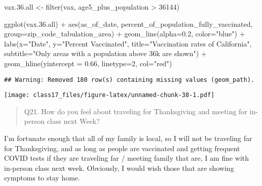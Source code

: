 \documentclass[
]{article}
\newenvironment{Shaded}{\begin{snugshade}}{\end{snugshade}}
\newcommand{\AttributeTok}[1]{\textcolor[rgb]{0.77,0.63,0.00}{#1}}
\newcommand{\DecValTok}[1]{\textcolor[rgb]{0.00,0.00,0.81}{#1}}
\newcommand{\FloatTok}[1]{\textcolor[rgb]{0.00,0.00,0.81}{#1}}
\newcommand{\FunctionTok}[1]{\textcolor[rgb]{0.00,0.00,0.00}{#1}}
\newcommand{\NormalTok}[1]{#1}
\newcommand{\OtherTok}[1]{\textcolor[rgb]{0.56,0.35,0.01}{#1}}
\newcommand{\SpecialCharTok}[1]{\textcolor[rgb]{0.00,0.00,0.00}{#1}}
\newcommand{\StringTok}[1]{\textcolor[rgb]{0.31,0.60,0.02}{#1}}
\begin{document}
\begin{Shaded}
\begin{Highlighting}[]
\NormalTok{vax.}\FloatTok{36.}\NormalTok{all }\OtherTok{\textless{}{-}} \FunctionTok{filter}\NormalTok{(vax, age5\_plus\_population }\SpecialCharTok{\textgreater{}} \DecValTok{36144}\NormalTok{)}


\FunctionTok{ggplot}\NormalTok{(vax.}\FloatTok{36.}\NormalTok{all) }\SpecialCharTok{+}
  \FunctionTok{aes}\NormalTok{(as\_of\_date,}
\NormalTok{      percent\_of\_population\_fully\_vaccinated, }
      \AttributeTok{group=}\NormalTok{zip\_code\_tabulation\_area) }\SpecialCharTok{+}
  \FunctionTok{geom\_line}\NormalTok{(}\AttributeTok{alpha=}\FloatTok{0.2}\NormalTok{, }\AttributeTok{color=}\StringTok{"blue"}\NormalTok{) }\SpecialCharTok{+}
  \FunctionTok{labs}\NormalTok{(}\AttributeTok{x=}\StringTok{"Date"}\NormalTok{, }\AttributeTok{y=}\StringTok{"Percent Vaccinated"}\NormalTok{,}
       \AttributeTok{title=}\StringTok{"Vaccination rates of California"}\NormalTok{,}
       \AttributeTok{subtitle=}\StringTok{"Only areas with a population above 36k are shown"}\NormalTok{) }\SpecialCharTok{+}
  \FunctionTok{geom\_hline}\NormalTok{(}\AttributeTok{yintercept =} \FloatTok{0.66}\NormalTok{, }\AttributeTok{linetype=}\DecValTok{2}\NormalTok{, }\AttributeTok{col=}\StringTok{"red"}\NormalTok{)}
\end{Highlighting}
\end{Shaded}

\begin{verbatim}
## Warning: Removed 180 row(s) containing missing values (geom_path).
\end{verbatim}

\texttt{[image: class17\_files/figure-latex/unnamed-chunk-38-1.pdf]}

\begin{quote}
Q21. How do you feel about traveling for Thanksgiving and meeting for
in-person class next Week?
\end{quote}

I'm fortunate enough that all of my family is local, so I will not be
traveling far for Thanksgiving, and as long as people are vaccinated and
getting frequent COVID tests if they are traveling far / meeting family
that are, I am fine with in-person class next week. Obviously, I would
wish those that are showing symptoms to stay home.
\end{document}
